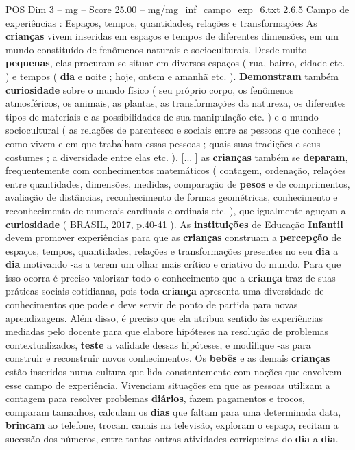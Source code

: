 \begin{textsample}{POS Dim 3 – mg – Score 25.00 – mg/mg\_inf\_campo\_exp\_6.txt}  \label{ex:f3_pos_262}
2.6.5 Campo de experiências : Espaços, tempos, quantidades, relações e transformações As \textbf{crianças} vivem inseridas em espaços e tempos de diferentes dimensões, em um mundo constituído de fenômenos naturais e socioculturais.
Desde muito \textbf{pequenas}, elas procuram se situar em diversos espaços ( rua, bairro, cidade etc. ) e tempos ( \textbf{dia} e noite ; hoje, ontem e amanhã etc. ). \textbf{Demonstram} também \textbf{curiosidade} sobre o mundo físico ( seu próprio corpo, os fenômenos atmosféricos, os animais, as plantas, as transformações da natureza, os diferentes tipos de materiais e as possibilidades de sua manipulação etc. ) e o mundo sociocultural ( as relações de parentesco e sociais entre as pessoas que conhece ; como vivem e em que trabalham essas pessoas ; quais suas tradições e seus costumes ; a diversidade entre elas etc. ). [... ] as \textbf{crianças} também se \textbf{deparam}, frequentemente com conhecimentos matemáticos ( contagem, ordenação, relações entre quantidades, dimensões, medidas, comparação de \textbf{pesos} e de comprimentos, avaliação de distâncias, reconhecimento de formas geométricas, conhecimento e reconhecimento de numerais cardinais e ordinais etc. ), que igualmente aguçam a \textbf{curiosidade} ( BRASIL, 2017, p.40-41 ).
As \textbf{instituições} de Educação \textbf{Infantil} devem promover experiências para que as \textbf{crianças} construam a \textbf{percepção} de espaços, tempos, quantidades, relações e transformações presentes no seu \textbf{dia} a \textbf{dia} motivando -as a terem um olhar mais crítico e criativo do mundo.
Para que isso ocorra é preciso valorizar todo o conhecimento que a \textbf{criança} traz de suas práticas sociais cotidianas, pois toda \textbf{criança} apresenta uma diversidade de conhecimentos que pode e deve servir de ponto de partida para novas aprendizagens.
Além disso, é preciso que ela atribua sentido às experiências mediadas pelo docente para que elabore hipóteses na resolução de problemas contextualizados, \textbf{teste} a validade dessas hipóteses, e modifique -as para construir e reconstruir novos conhecimentos.
Os \textbf{bebês} e as demais \textbf{crianças} estão inseridos numa cultura que lida constantemente com noções que envolvem esse campo de experiência.
Vivenciam situações em que as pessoas utilizam a contagem para resolver problemas \textbf{diários}, fazem pagamentos e trocos, comparam tamanhos, calculam os \textbf{dias} que faltam para uma determinada data, \textbf{brincam} ao telefone, trocam canais na televisão, exploram o espaço, recitam a sucessão dos números, entre tantas outras atividades corriqueiras do \textbf{dia} a \textbf{dia}.

\end{textsample}
